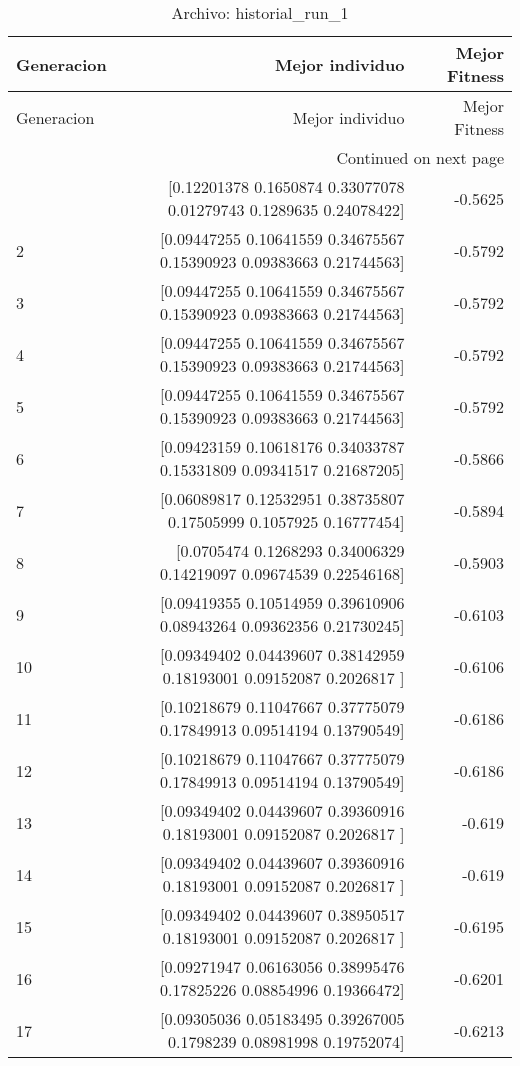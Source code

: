 \begin{longtable}{lrr}
\caption{Archivo: historial\_run\_1}\label{tab:historial_run_1} \\
\toprule
Generacion & Mejor individuo & Mejor Fitness \\
\midrule
\endfirsthead
\toprule
Generacion & Mejor individuo & Mejor Fitness \\
\midrule
\endhead
\midrule
\multicolumn{3}{r}{Continued on next page} \\
\midrule
\endfoot
\bottomrule
\endlastfoot
1 & [0.12201378 0.1650874  0.33077078 0.01279743 0.1289635  0.24078422] & -0.5625 \\
2 & [0.09447255 0.10641559 0.34675567 0.15390923 0.09383663 0.21744563] & -0.5792 \\
3 & [0.09447255 0.10641559 0.34675567 0.15390923 0.09383663 0.21744563] & -0.5792 \\
4 & [0.09447255 0.10641559 0.34675567 0.15390923 0.09383663 0.21744563] & -0.5792 \\
5 & [0.09447255 0.10641559 0.34675567 0.15390923 0.09383663 0.21744563] & -0.5792 \\
6 & [0.09423159 0.10618176 0.34033787 0.15331809 0.09341517 0.21687205] & -0.5866 \\
7 & [0.06089817 0.12532951 0.38735807 0.17505999 0.1057925  0.16777454] & -0.5894 \\
8 & [0.0705474  0.1268293  0.34006329 0.14219097 0.09674539 0.22546168] & -0.5903 \\
9 & [0.09419355 0.10514959 0.39610906 0.08943264 0.09362356 0.21730245] & -0.6103 \\
10 & [0.09349402 0.04439607 0.38142959 0.18193001 0.09152087 0.2026817 ] & -0.6106 \\
11 & [0.10218679 0.11047667 0.37775079 0.17849913 0.09514194 0.13790549] & -0.6186 \\
12 & [0.10218679 0.11047667 0.37775079 0.17849913 0.09514194 0.13790549] & -0.6186 \\
13 & [0.09349402 0.04439607 0.39360916 0.18193001 0.09152087 0.2026817 ] & -0.619 \\
14 & [0.09349402 0.04439607 0.39360916 0.18193001 0.09152087 0.2026817 ] & -0.619 \\
15 & [0.09349402 0.04439607 0.38950517 0.18193001 0.09152087 0.2026817 ] & -0.6195 \\
16 & [0.09271947 0.06163056 0.38995476 0.17825226 0.08854996 0.19366472] & -0.6201 \\
17 & [0.09305036 0.05183495 0.39267005 0.1798239  0.08981998 0.19752074] & -0.6213 \\

\end{longtable}
